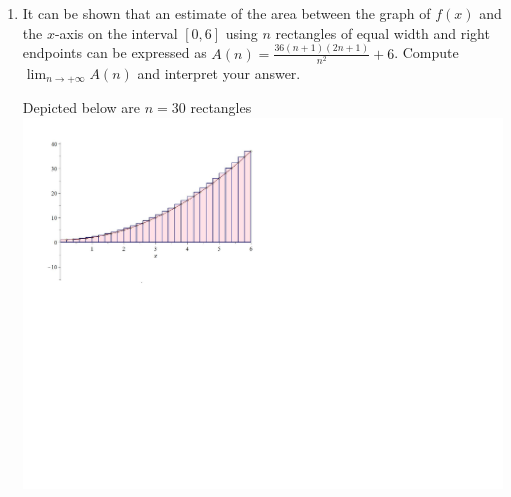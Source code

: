\documentclass[12pt]{article}
\newif\ifans
\begin{document}
\begin{enumerate}
\begin{enumerate}
\ifans{\fbox{\parbox{1\linewidth}{$A\approx 118$; This is an overestimate; but, it is closer to the actual area than the estmate from part (a).}}} \fi

\item It can be shown that an estimate of the area between the graph of $f(x)$ and the $x$-axis on the interval $[0,6]$ using $n$ rectangles of equal width and right endpoints can be expressed as $A(n)=\frac{36(n+1)(2n+1)}{n^2}+6$.  Compute $\lim_{n\rightarrow +\infty}A(n)$ and interpret your answer.

\begin{center}
Depicted below are $n=30$ rectangles\\
\includegraphics[scale=0.5]{nrect.pdf}
\end{center}

\ifans{\fbox{$\lim_{n\rightarrow +\infty}A(n)=78$.  This is the exact area between the graph of $f(x)$ and the $x$-axis on $[0,6]$}} \fi

\end{enumerate}

\end{enumerate}
\end{document}
